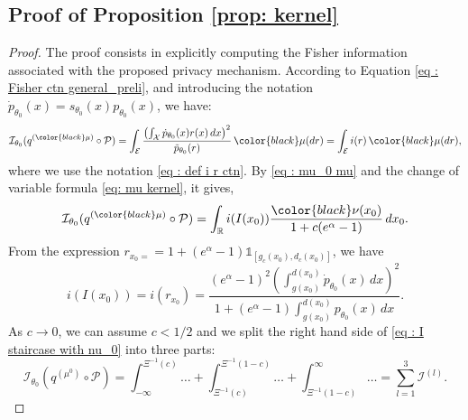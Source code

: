 \documentclass[a4paper, 11pt]{article}
\theoremstyle{definition}
\newcommand{\modar}{\color{black}}
\newcommand{\indi}[1]{\mathds{1}_{#1}}
\begin{document}
{\subsection{Proof of Proposition \ref{prop: kernel}}
\begin{proof}
	The proof consists in explicitly computing the Fisher information associated with the proposed privacy mechanism.
	 According to Equation \eqref{eq : Fisher ctn general_preli}, and {\modar introducing the notation 
	 	$\dot{p}_{\theta_0}(x)= s_{\theta_0}(x) p_{\theta_0}(x)$,}
we have:
	\begin{equation*}
	\mathcal{I}_{\theta_0} (q^{({\modar \mu})} \circ \mathcal{P}) = \int_\mathcal{E} \frac{\left( \int_\mathcal{X} \dot{p}_{\theta_0}(x) r(x) \, dx \right)^2}{\tilde{p}_{\theta_0}(r)} \, {\modar \mu(dr)} =  \int_\mathcal{E} i(r)  \, {\modar \mu}(dr),
	\end{equation*}
	where we use the notation \eqref{eq : def i r ctn}. 
	By \eqref{eq : mu_0 mu} and the change of variable formula \eqref{eq: mu kernel}, it gives,
	\begin{equation} \label{eq : I staircase with nu_0}
		\mathcal{I}_{\theta_0} (q^{({\modar \mu})} \circ \mathcal{P}) =
		\int_\mathbb{R}  i(I(x_0)) \frac{{\modar\nu}(x_0)}{1+c(e^\alpha-1)} \, dx_0 .
	\end{equation}	
	From the expression {\modar $r_{x_0=}=1+ (e^\alpha - 1) \indi{[g_c(x_0),d_c(x_0)]}$,} we have 
	\begin{equation} \label{eq : i I x0 explicite}
		i(I(x_0))=i(r_{x_0})=\frac{\left(e^\alpha-1\right)^2  \left( \int_{g(x_0)}^{d(x_0)}\dot{p}_{\theta_0}(x)\,dx\right)^2}
		{1+\left(e^\alpha-1\right) \int_{g(x_0)}^{d(x_0)} p_{\theta_0}(x)\,dx}.
	\end{equation}
As $c \to 0$, we can assume $c<1/2$ and we split the right hand side of \eqref{eq : I staircase with nu_0}
into three parts:
\begin{equation*}
		\mathcal{I}_{\theta_0} (q^{(\mu^0)} \circ \mathcal{P}) =
	\int_{-\infty}^{\Xi^{-1}(c)}  \dots + 
	\int_{\Xi^{-1}(c)}^{\Xi^{-1}(1-c)} \dots +
 	\int_{\Xi^{-1}(1-c)}^\infty \dots
 	= \sum_{l=1}^3 \mathcal{I}^{(l)}.
\end{equation*}	

\end{proof}}
\end{document}
